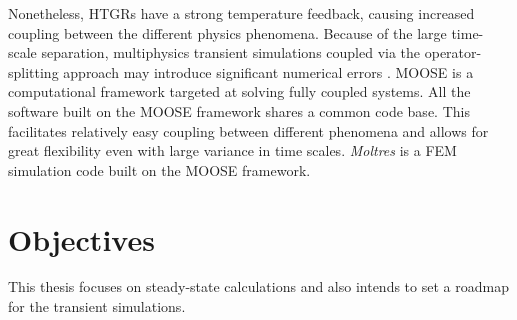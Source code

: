 \documentclass[11pt,letterpaper]{article}
\begin{document}
Nonetheless, \glspl{HTGR} have a strong temperature feedback, causing increased coupling between the different physics phenomena.
Because of the large time-scale separation, multiphysics transient simulations coupled via the operator-splitting approach may introduce significant numerical errors \cite{ragusa_consistent_2009} \cite{park_tightly_2010}.
\gls{MOOSE} \cite{gaston_moose_2009} is a computational framework targeted at solving fully coupled systems.
All the software built on the \gls{MOOSE} framework shares a common code base.
This facilitates relatively easy coupling \cite{novak_pronghorn_2018} between different phenomena and allows for great flexibility even with large variance in time scales.
\textit{Moltres} \cite{lindsay_introduction_2018} is a \gls{FEM} simulation code built on the \gls{MOOSE} framework.



\section{Objectives}

This thesis focuses on steady-state calculations and also intends to set a roadmap for the transient simulations.

\pagebreak


\end{document}
